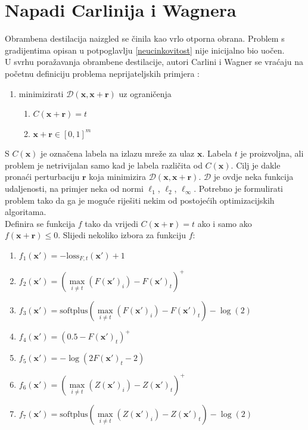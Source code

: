 \documentclass[utf8, diplomski]{fer}
\begin{document}
\section{Napadi Carlinija i Wagnera}\label{cw}
Obrambena destilacija naizgled se činila kao vrlo otporna obrana. Problem s gradijentima opisan u potpoglavlju \ref{neucinkovitost} nije inicijalno bio uočen. \\
U svrhu poražavanja obrambene destilacije, autori Carlini i Wagner se vraćaju na početnu definiciju problema neprijateljskih primjera \citep{Carlini2017TowardsET}: 
\begin{enumerate}[noitemsep, label=\textbullet]
  \item minimizirati $\mathcal{D}(\boldsymbol{x}, \boldsymbol{x} + \boldsymbol{r})$ uz ograničenja
  \begin{enumerate}
  \item $C(\boldsymbol{x}+\boldsymbol{r}) = t$
  \item $\boldsymbol{x} + \boldsymbol{r} \in [0, 1]^{m}$
  \end{enumerate}
\end{enumerate}
S $C(\boldsymbol{x})$ je označena labela na izlazu mreže za ulaz $\boldsymbol{x}$. Labela $t$ je proizvoljna, ali problem je netrivijalan samo kad je labela različita od $C(\boldsymbol{x})$. Cilj je dakle pronaći perturbaciju $\boldsymbol{r}$ koja minimizira $\mathcal{D}(\boldsymbol{x}, \boldsymbol{x} + \boldsymbol{r})$. $\mathcal{D}$ je ovdje neka funkcija udaljenosti, na primjer neka od normi $\ell_{1}$, $\ell_{2}$, $\ell_{\infty}$. Potrebno je formulirati problem tako da ga je moguće riješiti nekim od postojećih optimizacijskih algoritama. \\
Definira se funkcija $f$ tako da vrijedi $C(\boldsymbol{x}+\boldsymbol{r}) = t$ ako i samo ako $f(\boldsymbol{x} + \boldsymbol{r}) \leq 0$. Slijedi nekoliko izbora za funkciju $f$:
\begin{enumerate}[topsep=0pt,parsep=0pt,partopsep=0pt, label={}]
	\item $f_{1}(\boldsymbol{x}') = -\text{loss}_{F,t}(\boldsymbol{x}') + 1$
    \item $f_{2}(\boldsymbol{x}') = (\underset{i \neq t}{\max}(F(\boldsymbol{x}')_{i}) - F(\boldsymbol{x}')_{t})^{+}$
    \item $f_{3}(\boldsymbol{x}') = \text{softplus}(\underset{i \neq t}{\max}(F(\boldsymbol{x}')_{i}) - F(\boldsymbol{x}')_{t}) - \log(2)$
    \item $f_{4}(\boldsymbol{x}') = (0.5 - F(\boldsymbol{x}')_{t})^{+}$
    \item $f_{5}(\boldsymbol{x}') = -\log(2F(\boldsymbol{x}')_{t} - 2)$
    \item $f_{6}(\boldsymbol{x}') = (\underset{i \neq t}{\max}(Z(\boldsymbol{x}')_{i}) - Z(\boldsymbol{x}')_{t})^{+}$
    \item $f_{7}(\boldsymbol{x}') = \text{softplus}(\underset{i \neq t}{\max}(Z(\boldsymbol{x}')_{i}) - Z(\boldsymbol{x}')_{t}) - \log(2)$
\end{enumerate}
\end{document}
